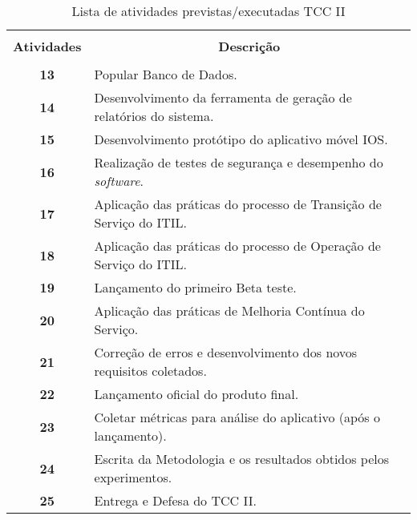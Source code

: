 \begin{table}[!h]
  \centering
  \begin{tabular}{cp{9.4cm}}
    \hline \hline &\\[-0.4cm]
    {\bf Atividades} & \multicolumn{1}{c}{\bf Descrição} \\
    \hline
    &\\[-0.4cm]
    \textbf{13} & Popular Banco de Dados. \\[0.2cm]
    \textbf{14} & Desenvolvimento da ferramenta de geração de relatórios do sistema. \\[0.2cm]
    \textbf{15} & Desenvolvimento protótipo do aplicativo móvel IOS. \\[0.2cm]
    \textbf{16} & Realização de testes de segurança e desempenho do \textit{software}. \\[0.2cm]
    \textbf{17} & Aplicação das práticas do processo de Transição de Serviço do ITIL. \\[0.2cm]
    \textbf{18} & Aplicação das práticas do processo de Operação de Serviço do ITIL. \\[0.2cm]
    \textbf{19} & Lançamento do primeiro Beta teste.\\[0.2cm]
    \textbf{20} & Aplicação das práticas de Melhoria Contínua do Serviço. \\[0.2cm]
    \textbf{21} & Correção de erros e desenvolvimento dos novos requisitos coletados. \\[0.2cm]
    \textbf{22} & Lançamento oficial do produto final. \\[0.2cm]
    \textbf{23} & Coletar métricas para análise do aplicativo (após o lançamento). \\[0.2cm]
    \textbf{24} & Escrita da Metodologia e os resultados obtidos pelos experimentos. \\[0.2cm]
    \textbf{25} & Entrega e Defesa do TCC II. \\[0.2cm]
    \hline \hline
  \end{tabular}
  \caption{Lista de atividades previstas/executadas TCC II}
  \label{table_tccII}
\end{table}

